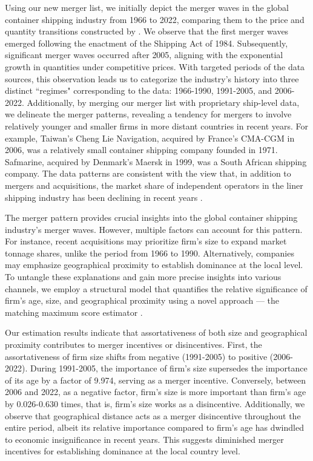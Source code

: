 \documentclass[10pt]{article}
\begin{document}
Using our new merger list, we initially depict the merger waves in the global container shipping industry from 1966 to 2022, comparing them to the price and quantity transitions constructed by \cite{matsuda2022unified}.
We observe that the first merger waves emerged following the enactment of the Shipping Act of 1984. 
Subsequently, significant merger waves occurred after 2005, aligning with the exponential growth in quantities under competitive prices. With targeted periods of the data sources, this observation leads us to categorize the industry's history into three distinct ``regimes" corresponding to the data: 1966-1990, 1991-2005, and 2006-2022.
Additionally, by merging our merger list with proprietary ship-level data, we delineate the merger patterns, revealing a tendency for mergers to involve relatively younger and smaller firms in more distant countries in recent years.
For example, Taiwan's Cheng Lie Navigation, acquired by France's CMA-CGM in 2006, was a relatively small container shipping company founded in 1971. 
Safmarine, acquired by Denmark's Maersk in 1999, was a South African shipping company. 
The data patterns are consistent with the view that, in addition to mergers and acquisitions, the market share of independent operators in the liner shipping industry has been declining in recent years \citep{Merk2022MEL}. 

The merger pattern provides crucial insights into the global container shipping industry's merger waves.
However, multiple factors can account for this pattern. 
For instance, recent acquisitions may prioritize firm's size to expand market tonnage shares, unlike the period from 1966 to 1990. 
Alternatively, companies may emphasize geographical proximity to establish dominance at the local level.
To untangle these explanations and gain more precise insights into various channels, we employ a structural model that quantifies the relative significance of firm's age, size, and geographical proximity using a novel approach — the matching maximum score estimator \cite{fox2018qe}.

Our estimation results indicate that assortativeness of both size and geographical proximity contributes to merger incentives or disincentives. 
First, the assortativeness of firm size shifts from negative (1991-2005) to positive (2006-2022). 
During 1991-2005, the importance of firm's size supersedes the importance of its age by a factor of 9.974, serving as a merger incentive.
Conversely, between 2006 and 2022, as a negative factor, firm's size is more important than firm's age by 0.026-0.630 times, that is, firm's size works as a disincentive.
Additionally, we observe that geographical distance acts as a merger disincentive throughout the entire period, albeit its relative importance compared to firm's age has dwindled to economic insignificance in recent years. 
This suggests diminished merger incentives for establishing dominance at the local country level.
\end{document}
